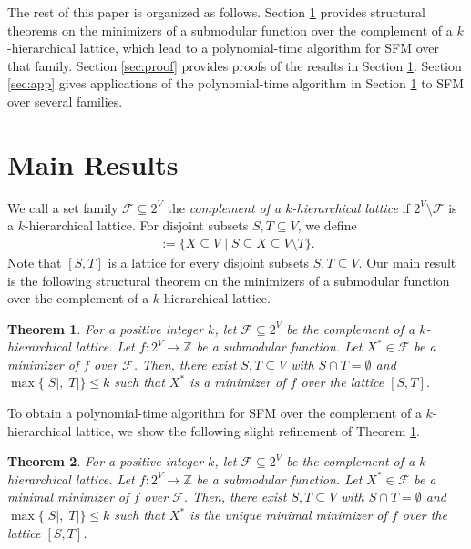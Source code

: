 \documentclass[11pt,letterpaper]{article}
\theoremstyle{plain}
\newtheorem{theorem}{Theorem}[section]
\theoremstyle{definition}
\begin{document}
The rest of this paper is organized as follows.
Section \ref{sec:result} provides structural theorems on the minimizers of a submodular function over the complement of a $k$-hierarchical lattice, which lead to a polynomial-time algorithm for SFM over that family.
Section \ref{sec:proof} provides proofs of the results in Section \ref{sec:result}.
Section \ref{sec:app} gives applications of the polynomial-time algorithm in Section \ref{sec:result} to SFM over several families.

\section{Main Results}
\label{sec:result}
We call a set family $\mathcal{F}\subseteq 2^V$ the \textit{complement of a $k$-hierarchical lattice} if $2^V\setminus \mathcal{F}$ is a $k$-hierarchical lattice.
For disjoint subsets $S,T\subseteq V$, we define
\begin{align*}
[S,T]:=\{X\subseteq V\mid S\subseteq X\subseteq V\setminus T\}.
\end{align*}
Note that $[S,T]$ is a lattice for every disjoint subsets $S,T\subseteq V$.
Our main result is the following structural theorem on the minimizers of a submodular function over the complement of a $k$-hierarchical lattice.
\begin{theorem}
\label{thm:minimizer}
For a positive integer $k$, let $\mathcal{F}\subseteq 2^V$ be the complement of a $k$-hierarchical lattice.
Let $f:2^V\to \mathbb{Z}$ be a submodular function.
Let $X^*\in \mathcal{F}$ be a minimizer of $f$ over $\mathcal{F}$.
Then, there exist $S,T\subseteq V$ with $S\cap T=\emptyset$ and $\max\{|S|,|T|\}\le k$ such that $X^*$ is a minimizer of $f$ over the lattice $[S,T]$.
\end{theorem}

To obtain a polynomial-time algorithm for SFM over the complement of a $k$-hierarchical lattice, we show the following  slight refinement of Theorem \ref{thm:minimizer}.

\begin{theorem}
\label{thm:minimal_minimizer}
For a positive integer $k$, let $\mathcal{F}\subseteq 2^V$ be the complement of a $k$-hierarchical lattice.
Let $f:2^V\to \mathbb{Z}$ be a submodular function.
Let $X^*\in \mathcal{F}$ be a minimal minimizer of $f$ over $\mathcal{F}$.
Then, there exist $S,T\subseteq V$ with $S\cap T=\emptyset$ and $\max\{|S|,|T|\}\le k$ such that $X^*$ is the unique minimal minimizer of $f$ over the lattice $[S,T]$.
\end{theorem}
\end{document}

